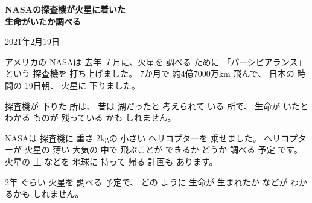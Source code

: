 \documentclass[a5paper,10pt]{tekst}
\begin{document}
	\thispagestyle{empty}
	\onehalfspacing
	\begin{center}
		\Huge\bfseries NASAの探査機が火星に着いた\\生命がいたか調べる
	\end{center}
	\vspace{2em}
	\begin{flushright}
		\Large 2021年2月19日
	\end{flushright}
	\vspace{2em}
	
	\CJKspace
	{\Large\sloppy
		\mbox{アメリカの} \mbox{NASAは} \mbox{去年} \mbox{７月に}、\mbox{火星を} \mbox{調べる} \mbox{ために} 「\mbox{パーシビアランス}」 \mbox{という} \mbox{探査機を} \mbox{打ち上げました}。
		\mbox{7か月で} \mbox{約4億7000万km} \mbox{飛んで}、 \mbox{日本の} \mbox{時間の} \mbox{19日朝}、 \mbox{火星に} \mbox{下りました}。
		
		\mbox{探査機が} \mbox{下りた} \mbox{所は}、 \mbox{昔は} \mbox{湖だったと} \mbox{考えられて} \mbox{いる} \mbox{所で}、 \mbox{生命が} \mbox{いたと} \mbox{わかる} \mbox{ものが} \mbox{残っている} \mbox{かも} \mbox{しれません}。
		
		\mbox{NASAは} \mbox{探査機に} \mbox{重さ} \mbox{2kgの} \mbox{小さい} \mbox{ヘリコプターを} \mbox{乗せました。}
		\mbox{ヘリコプターが} \mbox{火星の} \mbox{薄い} \mbox{大気の} \mbox{中で} \mbox{飛ぶことが} \mbox{できるか} \mbox{どうか} \mbox{調べる} \mbox{予定} \mbox{です}。
		\mbox{火星の} \mbox{土} \mbox{などを} \mbox{地球に} \mbox{持って} \mbox{帰る} \mbox{計画も} \mbox{あります}。
		
		\mbox{2年} \mbox{ぐらい} \mbox{火星を} \mbox{調べる} \mbox{予定で}、 \mbox{どの} \mbox{ように} \mbox{生命が} \mbox{生まれたか} \mbox{などが} \mbox{わかるかも} \mbox{しれません}。
		
	}

	\clearpage
	
\end{document}
